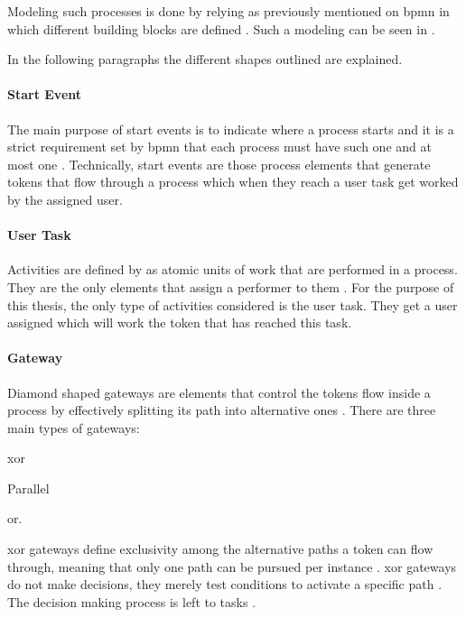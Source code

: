 Modeling such processes is done by relying as previously mentioned on \gls{bpmn} in which different building blocks are defined \citep{Silver2011}. Such a modeling can be seen in .


In the following paragraphs the different shapes outlined are explained.

\paragraph{Start Event}

The main purpose of start events is to indicate where a process starts and it is a strict requirement set by \gls{bpmn} that each process must have such one and at most one \citep{Silver2011}. Technically, start events are those process elements that generate tokens that flow through a process which when they reach a user task get worked by the assigned user.

\paragraph{User Task}

Activities are defined by \citet{Silver2011} as atomic units of work that are performed in a process. They are the only elements that assign a performer to them \citep{Silver2011}. For the purpose of this thesis, the only type of activities considered is the user task. They get a user assigned which will work the token that has reached this task.

\paragraph{Gateway}

Diamond shaped gateways are elements that control the tokens flow inside a process by effectively splitting its path into alternative ones \citep{Silver2011}. There are three main types of gateways:
\begin{enumerate*}
	\item \gls{xor}
	\item Parallel
	\item \gls{or}.
\end{enumerate*}

\gls{xor} gateways define exclusivity among the alternative paths a token can flow through, meaning that only one path can be pursued per instance \citep{Silver2011}. \gls{xor} gateways do not make decisions, they merely test conditions to activate a specific path \citep{Silver2011}. The decision making process is left to tasks \citep{Silver2011}.

